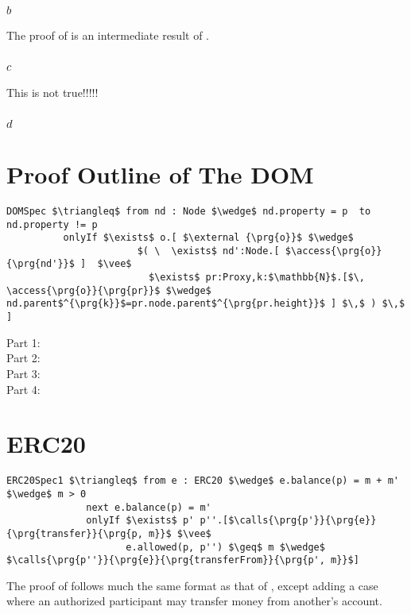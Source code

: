 \documentclass[acmsmall,review,anonymous]{acmart}\settopmatter{printfolios=true,printccs=false,printacmref=false}
\begin{document}
\subsection{$_b$}
The proof of  is an intermediate result of .

\subsection{$_c$}
This is not true!!!!!

\subsection{$_d$}


\section{Proof Outline of The DOM}

\begin{lstlisting}[language = Chainmail, mathescape=true, frame=lines]
DOMSpec $\triangleq$ from nd : Node $\wedge$ nd.property = p  to nd.property != p
          onlyIf $\exists$ o.[ $\external {\prg{o}}$ $\wedge$ 
                       $( \  \exists$ nd':Node.[ $\access{\prg{o}}{\prg{nd'}}$ ]  $\vee$ 
                         $\exists$ pr:Proxy,k:$\mathbb{N}$.[$\, \access{\prg{o}}{\prg{pr}}$ $\wedge$ nd.parent$^{\prg{k}}$=pr.node.parent$^{\prg{pr.height}}$ ] $\,$ ) $\,$ ]
\end{lstlisting}

\begin{description}
\item[Part 1:]

\item[Part 2:]
\item[Part 3:]
\item[Part 4:]
\end{description}

\section{ERC20}
\begin{lstlisting}[language = Chainmail, mathescape=true, frame=lines]
ERC20Spec1 $\triangleq$ from e : ERC20 $\wedge$ e.balance(p) = m + m' $\wedge$ m > 0
              next e.balance(p) = m'
              onlyIf $\exists$ p' p''.[$\calls{\prg{p'}}{\prg{e}}{\prg{transfer}}{\prg{p, m}}$ $\vee$ 
                     e.allowed(p, p'') $\geq$ m $\wedge$ $\calls{\prg{p''}}{\prg{e}}{\prg{transferFrom}}{\prg{p', m}}$]
\end{lstlisting}
The proof of  follows much the same format as that of ,
except adding a case where an authorized participant may transfer money from another's account.
\end{document}
